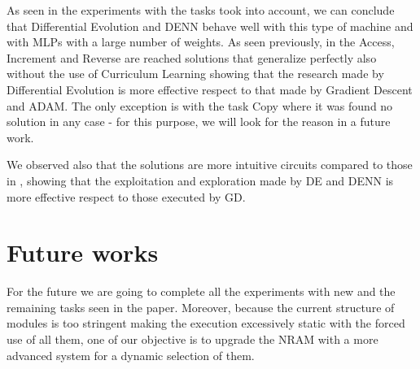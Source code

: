 

As seen in the experiments with the tasks took into account, we can conclude that Differential Evolution and DENN behave well with this type of machine and with MLPs with a large number of weights. As seen previously, in the Access, Increment and Reverse are reached solutions that generalize perfectly also without the use of Curriculum Learning showing that the research made by Differential Evolution is more effective respect to that made by Gradient Descent and ADAM. The only exception is with the task Copy where it was found no solution in any case - for this purpose, we will look for the reason in a future work. 

We observed also that the solutions are more intuitive circuits compared to those in \cite{NRAM:2016}, showing that the exploitation and exploration made by DE and DENN is more effective respect to those executed by GD.

\section{Future works}
For the future we are going to complete all the experiments with new and the remaining tasks seen in the paper. Moreover, because the current structure of modules is too stringent making the execution excessively static with the forced use of all them, one of our objective is to upgrade the NRAM with a more advanced system for a dynamic selection of them.